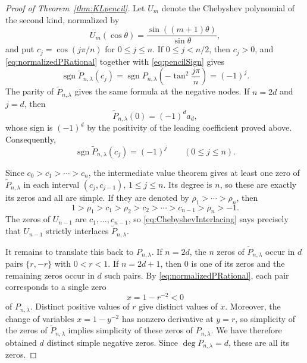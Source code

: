 \documentclass[10pt,a4paper]{amsart}
\DeclareMathOperator{\sgn}{sgn}
\begin{document}
\begin{proof}[Proof of Theorem~\ref{thm:KLpencil}]
Let $U_m$ denote the Chebyshev polynomial of the second kind,
normalized by
\begin{equation}\label{eq:ChebyshevSecondKind}
U_m(\cos\theta)=\frac{\sin((m+1)\theta)}{\sin\theta},
\end{equation}
and put $c_j=\cos(j\pi/n)$ for $0\le j\le n$.  If
$0\le j<n/2$, then $c_j>0$, and
\eqref{eq:normalizedPRational} together with \eqref{eq:pencilSign}
gives
\[
\sgn\widetilde P_{n,\lambda}(c_j)
=\sgn P_{n,\lambda}\!\left(-\tan^2\frac{j\pi}{n}\right)
=(-1)^j.
\]
The parity of $\widetilde P_{n,\lambda}$ gives the same formula at
the negative nodes.  If $n=2d$ and $j=d$, then
\[
\widetilde P_{n,\lambda}(0)=(-1)^d a_d,
\]
whose sign is $(-1)^d$ by the positivity of the leading coefficient
proved above.  Consequently,
\begin{equation}\label{eq:normalizedNodeSign}
\sgn\widetilde P_{n,\lambda}(c_j)=(-1)^j
\qquad(0\le j\le n).
\end{equation}

Since $c_0>c_1>\cdots>c_n$, the intermediate value theorem gives at
least one zero of $\widetilde P_{n,\lambda}$ in each interval
$(c_j,c_{j-1})$, $1\le j\le n$.  Its degree is $n$, so these are
exactly its zeros and all are simple.  If they are denoted by
$\rho_1>\cdots>\rho_n$, then
\begin{equation}\label{eq:ChebyshevInterlacing}
1>\rho_1>c_1>\rho_2>c_2>\cdots>
c_{n-1}>\rho_n>-1.
\end{equation}
The zeros of $U_{n-1}$ are $c_1,\ldots,c_{n-1}$, so
\eqref{eq:ChebyshevInterlacing} says precisely that $U_{n-1}$
strictly interlaces $\widetilde P_{n,\lambda}$.

It remains to translate this back to $P_{n,\lambda}$.  If $n=2d$,
the $n$ zeros of $\widetilde P_{n,\lambda}$ occur in $d$ pairs
$\{r,-r\}$ with $0<r<1$.  If $n=2d+1$, then $0$ is one of its
zeros and the remaining zeros occur in $d$ such pairs.  By
\eqref{eq:normalizedPRational}, each pair corresponds to a single zero
\[
x=1-r^{-2}<0
\]
of $P_{n,\lambda}$.  Distinct positive values of $r$ give distinct
values of $x$.  Moreover, the change of variables
$x=1-y^{-2}$ has nonzero derivative at $y=r$, so simplicity of the
zeros of $\widetilde P_{n,\lambda}$ implies simplicity of these
zeros of $P_{n,\lambda}$.  We have therefore obtained $d$ distinct
simple negative zeros.  Since $\deg P_{n,\lambda}=d$, these are all
its zeros.
\end{proof}
\end{document}
